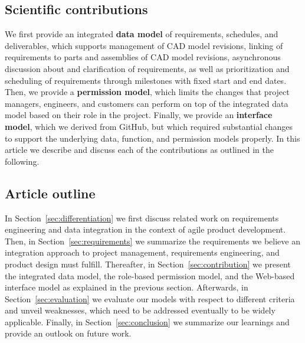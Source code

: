     \subsection*{Scientific contributions}
    We first provide an integrated \textbf{data model} of requirements, schedules, and deliverables, which supports management of CAD model revisions, linking of requirements to parts and assemblies of CAD model revisions, asynchronous discussion about and clarification of requirements, as well as prioritization and scheduling of requirements through milestones with fixed start and end dates.
    Then, we provide a \textbf{permission model}, which limits the changes that project managers, engineers, and customers can perform on top of the integrated data model based on their role in the project.
    Finally, we provide an \textbf{interface model}, which we derived from GitHub, but which required substantial changes to support the underlying data, function, and permission models properly.
    In this article we describe and discuss each of the contributions as outlined in the following.

    \subsection*{Article outline}
    In Section~\ref{sec:differentiation} we first discuss related work on requirements engineering and data integration in the context of agile product development.
    Then, in Section~\ref{sec:requirements} we summarize the requirements we believe an integration approach to project management, requirements engineering, and product design must fulfill.
    Thereafter, in Section~\ref{sec:contribution} we present the integrated data model, the role-based permission model, and the Web-based interface model as explained in the previous section.
    Afterwards, in Section~\ref{sec:evaluation} we evaluate our models with respect to different criteria and unveil weaknesses, which need to be addressed eventually to be widely applicable.
    Finally, in Section~\ref{sec:conclusion} we summarize our learnings and provide an outlook on future work.
    
